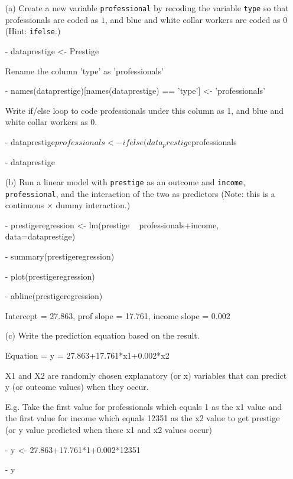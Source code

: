 \documentclass[12pt,letterpaper]{article}
\begin{document}
\newpage
\begin{enumerate}
	
	\item [(a)]
	Create a new variable \texttt{professional} by recoding the variable \texttt{type} so that professionals are coded as $1$, and blue and white collar workers are coded as $0$ (Hint: \texttt{ifelse}.)
	
	- dataprestige <- Prestige

Rename the column 'type' as 'professionals'

- names(dataprestige)[names(dataprestige) == 'type'] <- 'professionals'

Write if/else loop to code professionals under this column as 1, and blue and white collar workers as 0.

- dataprestige$professionals <- ifelse(data_prestige$professionals %

- dataprestige 
	\vspace{6cm}

	
	\item [(b)]
	Run a linear model with \texttt{prestige} as an outcome and \texttt{income}, \texttt{professional}, and the interaction of the two as predictors (Note: this is a continuous $\times$ dummy interaction.)

	- prestigeregression <- lm(prestige ~ professionals+income, data=dataprestige)
	
	-	summary(prestigeregression)
	
	- plot(prestigeregression)
	
	- abline(prestigeregression)

Intercept = 27.863, prof slope = 17.761, income slope = 0.002
	\vspace{6cm}
	\item [(c)]
	Write the prediction equation based on the result.

Equation = y = 27.863+17.761*x1+0.002*x2

X1 and X2 are randomly chosen explanatory (or x) variables that can  predict y (or outcome values) when they occur. 

E.g. Take the first value for professionals which equals 1 as the x1 value and the first value for income which equals 12351 as the x2 value to get prestige (or y value predicted when these x1 and x2 values occur)

-	y <- 27.863+17.761*1+0.002*12351

-	y 


\end{enumerate}
\end{document}
